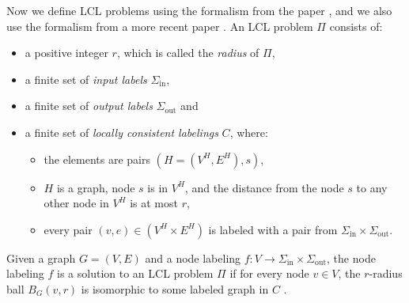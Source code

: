 \newcommand{\Sigmain}{\Sigma_{\text{in}}}
\newcommand{\Sigmaout}{\Sigma_{\text{out}}}


Now we define LCL problems using the formalism from the paper \cite{DBLP:journals/siamcomp/NaorS95}, and we also use the formalism from a more recent paper \cite{DBLP:journals/corr/abs-2105-05574}.
An LCL problem $\Pi$ consists of:
\begin{itemize}
  \item a positive integer $r$, which is called the \emph{radius} of $\Pi$,
  \item a finite set of \emph{input labels} $\Sigmain$,
  \item a finite set of \emph{output labels} $\Sigmaout$ and
  \item a finite set of \emph{locally consistent labelings} $C$, where:
  \begin{itemize}
    \item the elements are pairs $(H=(V^H, E^H), s)$,
    \item $H$ is a graph, node $s$ is in $V^H$, and the distance from the node $s$ to any other node in $V^H$ is at most $r$,
    \item every pair $(v, e) \in (V^H \times E^H)$ is labeled with a pair from $\Sigmain \times \Sigmaout$.
  \end{itemize}
\end{itemize}
Given a graph $G = (V, E)$ and a node labeling $f: V \rightarrow \Sigmain \times \Sigmaout$, the node labeling $f$ is a solution to an LCL problem $\Pi$ if for every node $v \in V$, the $r$-radius ball $B_G(v, r)$ is isomorphic to some labeled graph in $C$ \cite{DBLP:journals/corr/abs-2105-05574}.


